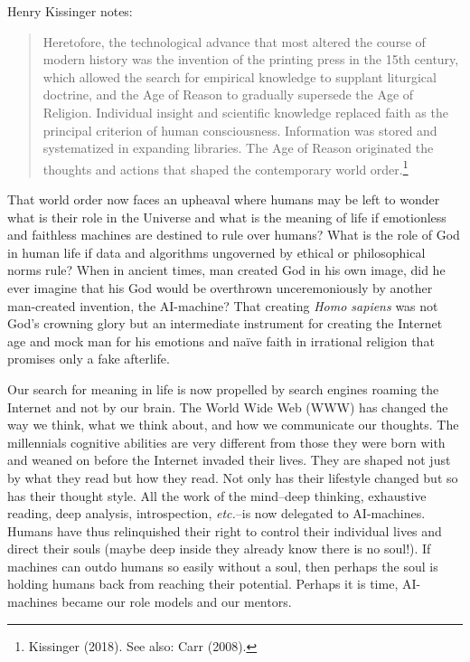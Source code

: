 \begin{multicols}{2}
Henry Kissinger notes:
\begin{quote}
Heretofore, the technological advance that most altered the course of modern history was the invention of the printing press in the 15th century, which allowed the search for empirical knowledge to supplant liturgical doctrine, and the Age of Reason to gradually supersede the Age of Religion. Individual insight and scientific knowledge replaced faith as the principal criterion of human consciousness. Information was stored and systematized in expanding libraries. The Age of Reason originated the thoughts and actions that shaped the contemporary world order.\footnote{Kissinger (2018). See also: Carr (2008).}
\end{quote}

That world order now faces an upheaval where humans may be left to wonder what is their role in the Universe and what is the meaning of life if emotionless and faithless machines are destined to rule over humans? What is the role of God in human life if data and algorithms ungoverned by ethical or philosophical norms rule? When in ancient times, man created God in his own image, did he ever imagine that his God would be overthrown unceremoniously by another man-created invention, the AI-machine? That creating \textit{Homo sapiens} was not God's crowning glory but an intermediate instrument for creating the Internet age and mock man for his emotions and naïve faith in irrational religion that promises only a fake afterlife.

Our search for meaning in life is now propelled by search engines roaming the Internet and not by our brain. The World Wide Web (WWW) has changed the way we think, what we think about, and how we communicate our thoughts. The millennials cognitive abilities are very different from those they were born with and weaned on before the Internet invaded their lives. They are shaped not just by what they read but how they read. Not only has their lifestyle changed but so has their thought style. All the work of the mind--deep thinking, exhaustive reading, deep analysis, introspection, \textit{etc.}--is now delegated to AI-machines. Humans have thus relinquished their right to control their individual lives and direct their souls (maybe deep inside they already know there is no soul!). If machines can outdo humans so easily without a soul, then perhaps the soul is holding humans back from reaching their potential. Perhaps it is time, AI-machines became our role models and our mentors.


\end{multicols}
